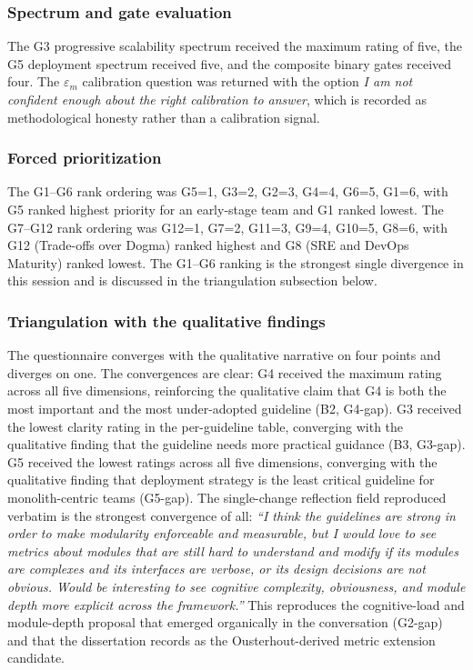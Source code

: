 \subsubsection*{Spectrum and gate evaluation}

The G3 progressive scalability spectrum received the maximum rating of five, the G5 deployment spectrum received five, and the composite binary gates received four. The $\varepsilon_m$ calibration question was returned with the option \emph{I am not confident enough about the right calibration to answer}, which is recorded as methodological honesty rather than a calibration signal.

\subsubsection*{Forced prioritization}

The G1--G6 rank ordering was G5=1, G3=2, G2=3, G4=4, G6=5, G1=6, with G5 ranked highest priority for an early-stage team and G1 ranked lowest. The G7--G12 rank ordering was G12=1, G7=2, G11=3, G9=4, G10=5, G8=6, with G12 (Trade-offs over Dogma) ranked highest and G8 (SRE and DevOps Maturity) ranked lowest. The G1--G6 ranking is the strongest single divergence in this session and is discussed in the triangulation subsection below.

\subsubsection*{Triangulation with the qualitative findings}

The questionnaire converges with the qualitative narrative on four points and diverges on one. The convergences are clear: G4 received the maximum rating across all five dimensions, reinforcing the qualitative claim that G4 is both the most important and the most under-adopted guideline (B2, G4-gap). G3 received the lowest clarity rating in the per-guideline table, converging with the qualitative finding that the guideline needs more practical guidance (B3, G3-gap). G5 received the lowest ratings across all five dimensions, converging with the qualitative finding that deployment strategy is the least critical guideline for monolith-centric teams (G5-gap). The single-change reflection field reproduced verbatim is the strongest convergence of all: \emph{``I think the guidelines are strong in order to make modularity enforceable and measurable, but I would love to see metrics about modules that are still hard to understand and modify if its modules are complexes and its interfaces are verbose, or its design decisions are not obvious. Would be interesting to see cognitive complexity, obviousness, and module depth more explicit across the framework.''} This reproduces the cognitive-load and module-depth proposal that emerged organically in the conversation (G2-gap) and that the dissertation records as the Ousterhout-derived metric extension candidate.

